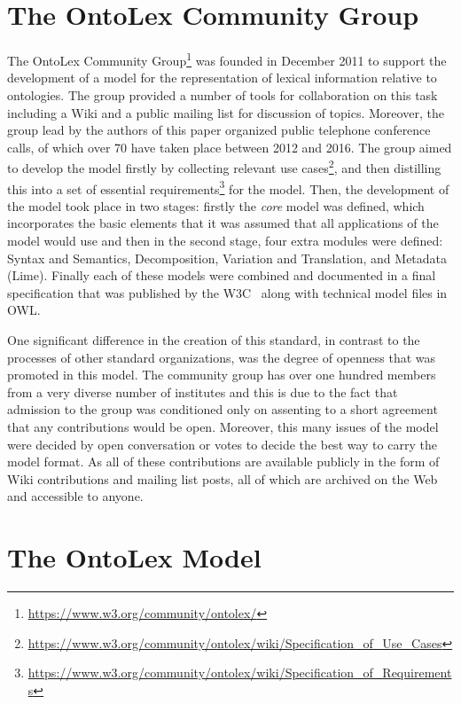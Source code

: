 \documentclass[12pt,a4paper]{elex2017}
\begin{document}
\section{The OntoLex Community Group}

The OntoLex Community
Group\footnote{\url{https://www.w3.org/community/ontolex/}}  was founded in
December 2011 to support the development of a model for the representation of
lexical information relative to ontologies. The group provided a number of tools
for collaboration on this task including a Wiki and a public mailing list for
discussion of topics. Moreover, the group lead by the authors of this paper
organized public telephone conference calls, of which over 70 have taken place
between 2012 and 2016. The group aimed to develop the model firstly by
collecting relevant use
cases\footnote{\url{https://www.w3.org/community/ontolex/wiki/Specification_of_Use_Cases}},
and then distilling this into a set of essential
requirements\footnote{\url{https://www.w3.org/community/ontolex/wiki/Specification_of_Requirements}}
for the model. Then, the development of the model took place in two stages:
firstly the \emph{core} model was defined, which incorporates the basic elements
that it was assumed that all applications of the model would use and then in the
second stage, four extra modules were defined: Syntax and Semantics,
Decomposition, Variation and Translation, and Metadata (Lime).
Finally each of these models were combined and documented in a final
specification that was published by the W3C~\cite{cimiano2016lexicon} along with
technical model files in OWL.

One significant difference in the creation of this standard, in contrast to the
processes of other standard organizations, was the degree of openness that was
promoted in this model. The community group has over one hundred members from a
very diverse number of institutes and this is due to the fact that admission to
the group was conditioned only on assenting to a short agreement that
any contributions would be open. Moreover, this many issues of the model were
decided by open conversation or votes to decide the best way to carry the model
format. As all of these contributions are available publicly in the form of Wiki
contributions and mailing list posts, all of which are archived on the Web and
accessible to anyone. 

\section{The OntoLex Model}
\end{document}
